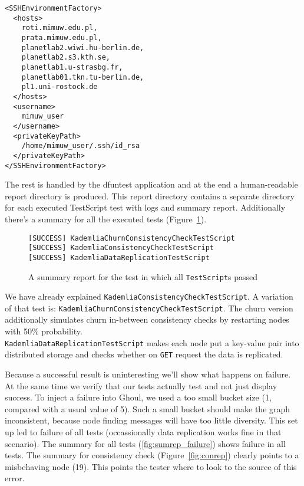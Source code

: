 \begin{verbatim}
<SSHEnvironmentFactory>
  <hosts>
    roti.mimuw.edu.pl,
    prata.mimuw.edu.pl,
    planetlab2.wiwi.hu-berlin.de,
    planetlab2.s3.kth.se,
    planetlab1.u-strasbg.fr,
    planetlab01.tkn.tu-berlin.de,
    pl1.uni-rostock.de
  </hosts>
  <username>
    mimuw_user
  </username>
  <privateKeyPath>
    /home/mimuw_user/.ssh/id_rsa
  </privateKeyPath>
</SSHEnvironmentFactory>
\end{verbatim}

The rest is handled by the dfuntest application and at the end a human-readable
report directory is produced. This report directory contains a separate
directory for each executed TestScript test with logs and summary report.
Additionally there's a summary for all the executed tests
(Figure~\ref{fig:sumrep}).

\begin{figure}[tbp]
\begin{verbatim}
[SUCCESS] KademliaChurnConsistencyCheckTestScript
[SUCCESS] KademliaConsistencyCheckTestScript
[SUCCESS] KademliaDataReplicationTestScript
\end{verbatim}
\caption{A summary report for the test in which all \texttt{TestScript}s passed}
\label{fig:sumrep}
\end{figure}

We have already explained \texttt{KademliaConsistencyCheckTestScript}. 
A variation of that test is:
\texttt{KademliaChurnConsistencyCheckTestScript}. 
The churn version additionally simulates churn in-between consistency checks by
restarting nodes with 50\% probability.\\
\texttt{KademliaDataReplicationTestScript} makes each node put a key-value pair
into distributed storage and checks whether on \texttt{GET} request the data is
replicated.

Because a successful result is uninteresting we'll show what happens on failure.
At the same time we verify that our tests actually test and not just display
success.
To inject a failure into Ghoul, we used a too small bucket size (1, compared
with a usual value of 5).
Such a small bucket should make the graph inconsistent, because node finding
messages will have too little diversity.
This set up led to failure of all tests (occassionally data replication works
fine in that scenario).
The summary for all tests (\ref{fig:sumrep_failure}) shows failure in all
tests.
The summary for consistency check (Figure~\ref{fig:conrep}) clearly points to a
misbehaving node (19). 
This points the tester where to look to the source of this error.

